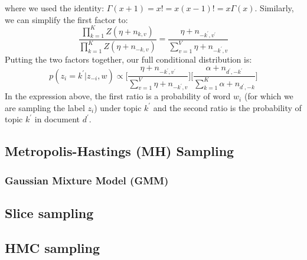 where we used the identity: $\Gamma(x+1) = x! = x(x-1)! = x\Gamma(x)$. Similarly, we can simplify the first factor to:
\begin{equation}
    \frac{\prod_{k=1}^{K}Z(\eta + n_{k,v})}{\prod_{k=1}^{K}Z(\eta + n_{-k,v})} = \frac{\eta + n_{-k^{\prime}, v^{\prime}}}{\sum_{v=1}^{V}\eta + n_{-k^{\prime}, v}}
\end{equation}
Putting the two factors together, our full conditional distribution is:
\begin{equation}
    p(z_i = k^{\prime}|z_{-i}, w) \propto \bigg[ \frac{\eta + n_{-k^{\prime},v^{\prime}}}{\sum_{v=1}^{V}\eta + n_{-k^{\prime}, v}} \bigg] \bigg[\frac{\alpha + n_{d^{\prime}, -k^{\prime}}}{\sum_{k=1}^{K}\alpha + n_{d^{\prime},-k}} \bigg]
\end{equation}
In the expression above, the first ratio is a probability of word $w_i$ (for which we are sampling the label $z_i$) under topic $k^{\prime}$ and the second ratio is the probability of topic $k^{\prime}$ in document $d^{\prime}$. 

\subsection{Metropolis-Hastings (MH) Sampling}
\subsubsection{Gaussian Mixture Model (GMM)}

\subsection{Slice sampling}
\subsection{HMC sampling}


